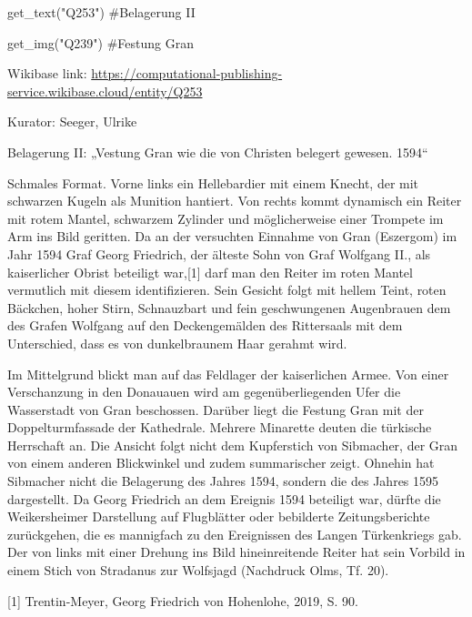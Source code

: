 \documentclass[
  a4paper,
  portrait]{book}
\newenvironment{Shaded}{\begin{snugshade}}{\end{snugshade}}
\newcommand{\CommentTok}[1]{\textcolor[rgb]{0.37,0.37,0.37}{#1}}
\newcommand{\NormalTok}[1]{\textcolor[rgb]{0.00,0.23,0.31}{#1}}
\newcommand{\StringTok}[1]{\textcolor[rgb]{0.13,0.47,0.30}{#1}}
\begin{document}
\begin{Shaded}
\begin{Highlighting}[]
\NormalTok{get\_text(}\StringTok{"Q253"}\NormalTok{)}
\CommentTok{\#Belagerung II}

\NormalTok{get\_img(}\StringTok{"Q239"}\NormalTok{)}
\CommentTok{\#Festung Gran}
\end{Highlighting}
\end{Shaded}

Wikibase link:
\url{https://computational-publishing-service.wikibase.cloud/entity/Q253}

Kurator: Seeger, Ulrike

Belagerung II: „Vestung Gran wie die von Christen belegert gewesen.
1594``

Schmales Format. Vorne links ein Hellebardier mit einem Knecht, der mit
schwarzen Kugeln als Munition hantiert. Von rechts kommt dynamisch ein
Reiter mit rotem Mantel, schwarzem Zylinder und möglicherweise einer
Trompete im Arm ins Bild geritten. Da an der versuchten Einnahme von
Gran (Eszergom) im Jahr 1594 Graf Georg Friedrich, der älteste Sohn von
Graf Wolfgang II., als kaiserlicher Obrist beteiligt war,{[}1{]} darf
man den Reiter im roten Mantel vermutlich mit diesem identifizieren.
Sein Gesicht folgt mit hellem Teint, roten Bäckchen, hoher Stirn,
Schnauzbart und fein geschwungenen Augenbrauen dem des Grafen Wolfgang
auf den Deckengemälden des Rittersaals mit dem Unterschied, dass es von
dunkelbraunem Haar gerahmt wird.

Im Mittelgrund blickt man auf das Feldlager der kaiserlichen Armee. Von
einer Verschanzung in den Donauauen wird am gegenüberliegenden Ufer die
Wasserstadt von Gran beschossen. Darüber liegt die Festung Gran mit der
Doppelturmfassade der Kathedrale. Mehrere Minarette deuten die türkische
Herrschaft an. Die Ansicht folgt nicht dem Kupferstich von Sibmacher,
der Gran von einem anderen Blickwinkel und zudem summarischer zeigt.
Ohnehin hat Sibmacher nicht die Belagerung des Jahres 1594, sondern die
des Jahres 1595 dargestellt. Da Georg Friedrich an dem Ereignis 1594
beteiligt war, dürfte die Weikersheimer Darstellung auf Flugblätter oder
bebilderte Zeitungsberichte zurückgehen, die es mannigfach zu den
Ereignissen des Langen Türkenkriegs gab. Der von links mit einer Drehung
ins Bild hineinreitende Reiter hat sein Vorbild in einem Stich von
Stradanus zur Wolfsjagd (Nachdruck Olms, Tf. 20).

{[}1{]} Trentin-Meyer, Georg Friedrich von Hohenlohe, 2019, S. 90.
\end{document}
